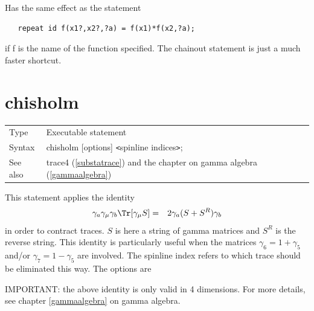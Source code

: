 \noindent Has the same effect as the statement
\begin{verbatim}
   repeat id f(x1?,x2?,?a) = f(x1)*f(x2,?a);
\end{verbatim}
if f is the name of the function specified. The chainout statement is just a 
much faster shortcut. \vspace{10mm}


\section{chisholm}
\label{substachisholm}

\noindent \begin{tabular}{ll}
Type & Executable statement\\
Syntax & chisholm [options] {\tt<}spinline indices{\tt>}; \\
See also & trace4 (\ref{substatrace}) and the chapter on gamma algebra 
(\ref{gammaalgebra})
\end{tabular} \vspace{4mm}

\noindent This statement applies the identity
\begin{eqnarray}
    \gamma_a\gamma_\mu\gamma_b \Tr[\gamma_\mu S] & = &
         2\gamma_a( S + S^R ) \gamma_b  \nonumber
\end{eqnarray}
in order to contract traces. $S$ is here a string of
gamma matrices and $S^R$ is the reverse string. This 
identity is particularly useful when the matrices $\gamma_6 = 1+\gamma_5$ 
and/or $\gamma_7 = 1-\gamma_5$ are involved. The spinline index refers to 
which trace should be eliminated this way. The options are \vspace{1mm}
 


\noindent IMPORTANT: the above identity is only valid in 4 dimensions. For 
more details, see chapter \ref{gammaalgebra} on gamma algebra. \vspace{10mm}

